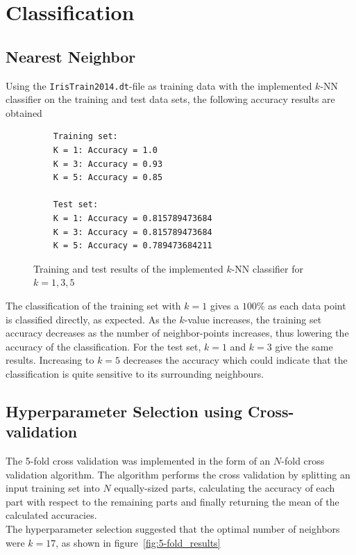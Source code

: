 \documentclass[a4paper]{article}
\begin{document}
\section{Classification}

\subsection{Nearest Neighbor}
Using the \texttt{IrisTrain2014.dt}-file as training data with the implemented $k$-NN classifier on the training and test data sets, the following accuracy results are obtained
\begin{figure}[H]
	\begin{lstlisting}
	Training set:
	K = 1: Accuracy = 1.0
	K = 3: Accuracy = 0.93
	K = 5: Accuracy = 0.85

	Test set:
	K = 1: Accuracy = 0.815789473684
	K = 3: Accuracy = 0.815789473684
	K = 5: Accuracy = 0.789473684211
	\end{lstlisting}
	\caption{Training and test results of the implemented $k$-NN classifier for $k=1,3,5$}
	\label{fig:k-nn_results}
\end{figure}

The classification of the training set with $k=1$ gives a $100\%$ as each data point is classified directly, as expected. As the $k$-value increases, the training set accuracy decreases as the number of neighbor-points increases, thus lowering the accuracy of the classification. For the test set, $k=1$ and $k=3$ give the same results. Increasing to $k=5$ decreases the accuracy which could indicate that the classification is quite sensitive to its surrounding neighbours.


\subsection{Hyperparameter Selection using Cross-validation}
The 5-fold cross validation was implemented in the form of an $N$-fold cross validation algorithm. The algorithm performs the cross validation by splitting an input training set into $N$ equally-sized parts, calculating the accuracy of each part with respect to the remaining parts and finally returning the mean of the calculated accuracies.\\

The hyperparameter selection suggested that the optimal number of neighbors were $k = 17$, as shown in figure~\ref{fig:5-fold_results}\\
\end{document}
